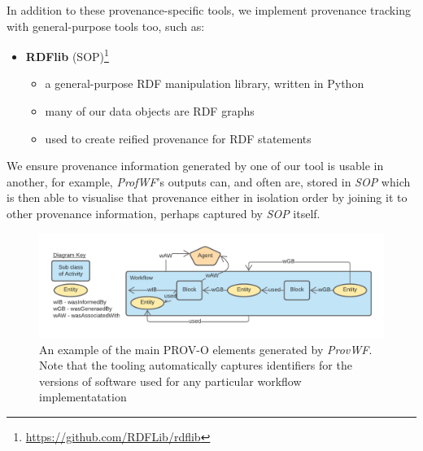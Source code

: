 \documentclass[letterpaper,twocolumn,10pt]{article}
\begin{document}
In addition to these provenance-specific tools, we implement provenance tracking with general-purpose tools too, such as:

\begin{itemize}
  \item \textbf{RDFlib} (SOP)\footnote{\url{https://github.com/RDFLib/rdflib}}
  \begin{itemize}
    \item a general-purpose RDF manipulation library, written in Python
    \item many of our data objects are RDF graphs
    \item used to create reified provenance for RDF statements     
  \end{itemize}
\end{itemize}  

We ensure provenance information generated by one of our tool is usable in another, for example, \textit{ProfWF}'s outputs
can, and often are, stored in \textit{SOP} which is then able to visualise that provenance either in isolation order
by joining it to other provenance information, perhaps captured by \textit{SOP} itself.


\begin{figure}
  \begin{center}
    \includegraphics[width=\textwidth]{images/provwf.png}
  \end{center}
  \caption{\label{fig:provwf} An example of the main PROV-O elements generated by \textit{ProvWF}. Note that the tooling automatically captures identifiers for the versions of software used for any particular workflow implementatation}
  \end{figure}
\end{document}
